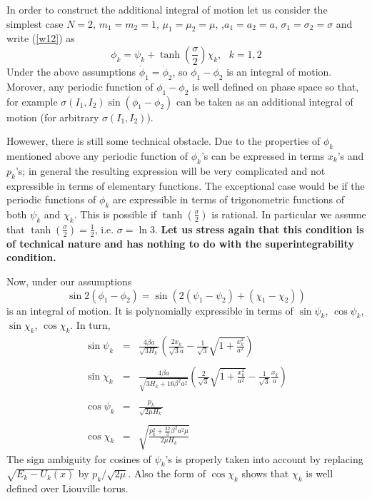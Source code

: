 \documentclass[a4paper,12pt]{article}
\begin{document}
In order to construct the additional integral of motion let us consider the simplest case 
$N=2$, $m_1=m_2=1$,  $\mu_1=\mu_2=\mu$, ,$a_1=a_2=a$, $\sigma_1=\sigma_2=\sigma$ and write (\ref{w12})
as
\begin{equation}
\phi_k = \psi_k+\tanh\left(\frac{\sigma}{2}\right)\chi_k, \ \ \ k=1,2
\label{w13}
\end{equation}
Under the above assumptions $\dot{\phi}_1=\dot{\phi}_2$, so $\phi_1-\phi_2$ is an integral of motion.
Morover, any periodic function of $\phi_1-\phi_2$ is well defined on phase space so that,
for example $\sigma(I_1,I_2)\sin(\phi_1-\phi_2)$ can be taken as an additional integral of motion
(for arbitrary $\sigma(I_1,I_2)$).

Howewer, there is still some technical obstacle. Due to the properties of $\phi_k$ mentioned above
any periodic function of $\phi_k$'s can be expressed in terms $x_k$'s and $p_k$'s;
in general the resulting expression will be very complicated and not expressible in terms
of elementary functions. The exceptional case would be if the periodic functions
 of $\phi_k$ are expressible in terms of trigonometric functions of both $\psi_k$ and $\chi_k$.
This is possible if $\tanh\left(\frac{\sigma}{2}\right)$ is rational.
In particular we assume that $\tanh\left(\frac{\sigma}{2}\right)=\frac{1}{2}$, i.e. 
$\sigma=\ln 3$.
{\bf Let us stress again that this condition is of technical nature and has nothing to do with
the superintegrability condition.}

Now, under our assumptions
\begin{equation}
\sin2(\phi_1-\phi_2)=\sin(2(\psi_1-\psi_2)+(\chi_1-\chi_2))
\label{w14}
\end{equation}
is an integral of motion. It is polynomially expressible in terms of $\sin\psi_k$, $\cos\psi_k$,
$\sin\chi_k$,  $\cos\chi_k$. In turn, 
\begin{equation}
\begin{array}{lcl}
\displaystyle\sin\psi_k & = & \frac{4\beta a}{\sqrt{3H_k}}\left(\frac{2x_k}{\sqrt{3}a}-\frac{1}{\sqrt{3}}\sqrt{
1+\frac{x_k^2}{a^2}}\right)\\
&&\\
\displaystyle\sin\chi_k&=&\frac{4\beta a}{\sqrt{3H_k+16\beta^2a^2}}\left(\frac{2}{\sqrt{3}}\sqrt{1+\frac{x_k^2}{a^2}}
-\frac{1}{\sqrt{3}}\frac{x_k}{a}\right)\nonumber\\
&&\\
\displaystyle\cos\psi_k&=&\frac{p_k}{\sqrt{2\mu H_k}}\\
&&\\
\displaystyle\cos\chi_k&=&\sqrt{\displaystyle\frac{p_k^2+\frac{32}{3}\beta^2a^2\mu}{2\mu H_k}}
\end{array}
\label{w15}
\end{equation}
The sign ambiguity for cosines of $\psi_k$'s is properly taken into account by replacing 
$\sqrt{E_k-U_k(x)}$ by $p_k/\sqrt{2\mu}$. Also the form of $\cos\chi_k$ shows that $\chi_k$
is well defined over Liouville torus.
\end{document}
